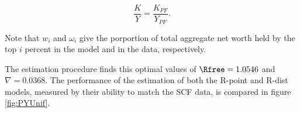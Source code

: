 \documentclass[\econtexRoot/Chp1proposal]{subfiles}
\begin{document}
$$ \frac{K}{Y} = \frac{K_{PF}}{Y_{PF}}. $$

\par Note that $w_i$ and $\omega_i$ give the porportion of total aggregate net worth held by the top $i$ percent in the model and in the data, respectively.

\par The estimation procedure finds this optimal values of $\Rfree = 1.0546$ and $\nabla = 0.0368$. The performance of the estimation of both the R-point and R-dist models, measured by their ability to match the SCF data, is compared in figure \ref{fig:PYUnif}.




\onlyinsubfile{}

\end{document}
